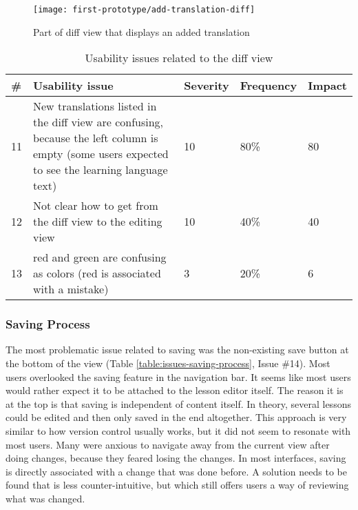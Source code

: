 \begin{figure}[h!]
 \centering
 \texttt{[image: first-prototype/add-translation-diff]}
 \caption{Part of diff view that displays an added translation}
 \label{fig:add-translation-diff}
\end{figure}

\begin{table}[h!]
\centering
\begin{tabular}{|l|p{7cm}|l|l|l|}
\hline
\rowcolor[HTML]{EFEFEF}
\textbf{\#} & \textbf{Usability issue} & \textbf{Severity} & \textbf{Frequency} & \textbf{Impact} \\ \hline
11 & New translations listed in the diff view are confusing, because the left column is empty (some users expected to see the learning language text) & 10 & 80\% & 80 \\ \hline
12 & Not clear how to get from the diff view to the editing view & 10 & 40\% & 40 \\ \hline
13 & red and green are confusing as colors (red is associated with a mistake) & 3 & 20\% & 6 \\ \hline
\end{tabular}
\caption{Usability issues related to the diff view}
\label{table:issues-diff}
\end{table}


\subsubsection{Saving Process}
The most problematic issue related to saving was the non-existing save button at the bottom of the view (Table \ref{table:issues-saving-process}, Issue \#14). Most users overlooked the saving feature in the navigation bar. It seems like most users would rather expect it to be attached to the lesson editor itself. The reason it is at the top is that saving is independent of content itself. In theory, several lessons could be edited and then only saved in the end altogether. This approach is very similar to how version control usually works, but it did not seem to resonate with most users. Many were anxious to navigate away from the current view after doing changes, because they feared losing the changes. In most interfaces, saving is directly associated with a change that was done before. A solution needs to be found that is less counter-intuitive, but which still offers users a way of reviewing what was changed.

